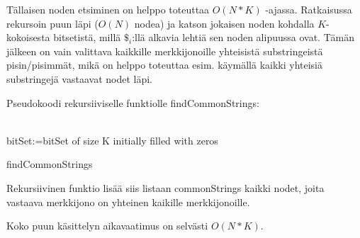 \documentclass{article}
\begin{document}
    Tällaisen noden etsiminen on helppo toteuttaa $O(N*K)$ -ajassa. Ratkaisussa rekursoin puun läpi ($O(N)$ nodea) ja katson 
    jokaisen noden kohdalla $K$-kokoisesta bitsetistä, millä $\$_i$:llä alkavia lehtiä sen noden alipuussa ovat. Tämän jälkeen
    on vain valittava kaikkille merkkijonoille yhteisistä substringeistä pisin/pisimmät, mikä on helppo toteuttaa esim. käymällä
    kaikki yhteisiä substringejä vastaavat nodet läpi.
    
    \newpage
    
    Pseudokoodi rekursiiviselle funktiolle findCommonStrings:
    \\ \\
    \begin{algorithm}[H]
        bitSet:=bitSet of size K initially filled with zeros\;
        \caption{findCommonStrings}
    \end{algorithm}

    \medskip \medskip
    Rekursiivinen funktio lisää siis listaan commonStrings kaikki nodet, joita vastaava merkkijono on yhteinen kaikille merkkijonoille.
    
    Koko puun käsittelyn aikavaatimus on selvästi $O(N*K)$.
    
    
    
\end{document}
